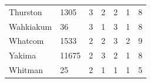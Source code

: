 \documentclass{mcmthesis}
\numberwithin{figure}{section}
\numberwithin{table}{section}
\begin{document}
\begin{table}[H]
\begin{tabular}{lllllll}
  Thurston     & 1305                                                   & 3                                                                             & 2                                                                 & 2                                                                           & 1                                                                                     & 8                                                                          \\
  Wahkiakum    & 36                                                     & 3                                                                             & 1                                                                 & 3                                                                           & 1                                                                                     & 8                                                                          \\
  Whatcom      & 1533                                                   & 2                                                                             & 2                                                                 & 3                                                                           & 2                                                                                     & 9                                                                          \\
  Yakima       & 11675                                                  & 2                                                                             & 3                                                                 & 2                                                                           & 1                                                                                     & 8                                                                          \\
  Whitman      & 25                                                     & 2                                                                             & 1                                                                 & 1                                                                           & 1                                                                                     & 5                                                                          \\ \hline
  \end{tabular}
  \end{table}
  
\end{document}
